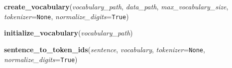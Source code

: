     \vspace{0.5ex}

\hspace{.8\funcindent}\begin{boxedminipage}{\funcwidth}

    \raggedright \textbf{create\_vocabulary}(\textit{vocabulary\_path}, \textit{data\_path}, \textit{max\_vocabulary\_size}, \textit{tokenizer}={\tt None}, \textit{normalize\_digits}={\tt True})

\setlength{\parskip}{2ex}
\setlength{\parskip}{1ex}
    \end{boxedminipage}

    \label{Chatbot:data_utils:initialize_vocabulary}

    \vspace{0.5ex}

\hspace{.8\funcindent}\begin{boxedminipage}{\funcwidth}

    \raggedright \textbf{initialize\_vocabulary}(\textit{vocabulary\_path})

\setlength{\parskip}{2ex}
\setlength{\parskip}{1ex}
    \end{boxedminipage}

    \label{Chatbot:data_utils:sentence_to_token_ids}

    \vspace{0.5ex}

\hspace{.8\funcindent}\begin{boxedminipage}{\funcwidth}

    \raggedright \textbf{sentence\_to\_token\_ids}(\textit{sentence}, \textit{vocabulary}, \textit{tokenizer}={\tt None}, \textit{normalize\_digits}={\tt True})

\setlength{\parskip}{2ex}
\setlength{\parskip}{1ex}
    \end{boxedminipage}

    \label{Chatbot:data_utils:data_to_token_ids}

    \vspace{0.5ex}

